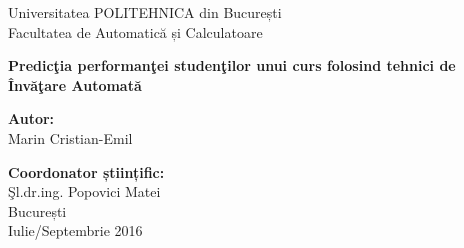 \thispagestyle{empty}
\begin{center}
\large
Universitatea POLITEHNICA din București \\
Facultatea de Automatică și Calculatoare \\

{\LARGE
	\textbf{Predicţia performanţei studenţilor unui curs folosind tehnici de Învăţare Automată}
}

\vspace{3cm}
\textbf{Autor:}\\
Marin Cristian-Emil

\bigskip
\bigskip

\textbf{Coordonator științific:}\\
Şl.dr.ing. Popovici Matei\\

București\\
Iulie/Septembrie 2016 \\
\vspace*{1cm}
\end{center}
